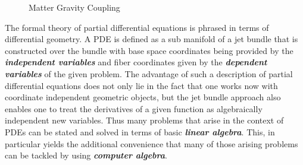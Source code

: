 \begin{figure}[hbt!]
\centering 
{}
\caption{Matter Gravity Coupling}\label{MatterGrav}
\end{figure}

The formal theory of partial differential equations is phrased in terms of differential geometry. A PDE is defined as a sub manifold of a jet bundle that is constructed over the bundle with base space coordinates being provided by the \textit{\textbf{independent variables}} and fiber coordinates given by the \textit{\textbf{dependent variables}} of the given problem. The advantage of such a description of partial differential equations does not only lie in the fact that one works now with coordinate independent geometric objects, but the jet bundle approach also enables one to treat the derivatives of a given function as algebraically independent new variables. Thus many problems that arise in the context of PDEs can be stated and solved in terms of basic \textit{\textbf{linear algebra}}. This, in particular yields the additional convenience that many of those arising problems can be tackled by using \textbf{\textit{computer algebra}}.


